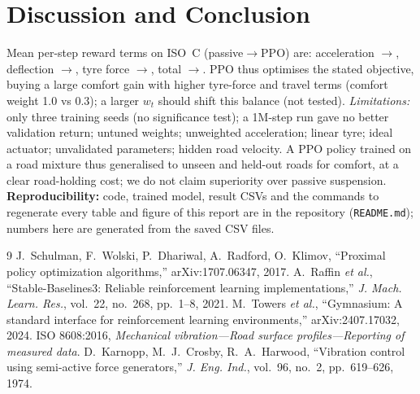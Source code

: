 \documentclass[10pt,twocolumn]{article}
\begin{document}
\section{Discussion and Conclusion}
Mean per-step reward terms on ISO~C (passive$\to$PPO) are: acceleration \NTermAccP$\to$\NTermAccN, deflection \NTermDefP$\to$\NTermDefN, tyre force \NTermTyreP$\to$\NTermTyreN, total \NTermTotP$\to$\NTermTotN. PPO thus optimises the stated objective, buying a large comfort gain with higher tyre-force and travel terms (comfort weight 1.0 vs 0.3); a larger $w_t$ should shift this balance (not tested). \emph{Limitations:} only three training seeds (no significance test); a 1M-step run gave no better validation return; untuned weights; unweighted acceleration; linear tyre; ideal actuator; unvalidated parameters; hidden road velocity. A PPO policy trained on a road mixture thus generalised to unseen and held-out roads for comfort, at a clear road-holding cost; we do not claim superiority over passive suspension. \textbf{Reproducibility:} code, trained model, result CSVs and the commands to regenerate every table and figure of this report are in the repository (\texttt{README.md}); numbers here are generated from the saved CSV files.

\begingroup\footnotesize\setlength{\itemsep}{0pt}
\begin{thebibliography}{9}\setlength{\itemsep}{0pt}\setlength{\parsep}{0pt}
 J.~Schulman, F.~Wolski, P.~Dhariwal, A.~Radford, O.~Klimov, ``Proximal policy optimization algorithms,'' arXiv:1707.06347, 2017.
 A.~Raffin \emph{et al.}, ``Stable-Baselines3: Reliable reinforcement learning implementations,'' \emph{J. Mach. Learn. Res.}, vol.~22, no.~268, pp.~1--8, 2021.
 M.~Towers \emph{et al.}, ``Gymnasium: A standard interface for reinforcement learning environments,'' arXiv:2407.17032, 2024.
 ISO 8608:2016, \emph{Mechanical vibration---Road surface profiles---Reporting of measured data}.
 D.~Karnopp, M.~J.~Crosby, R.~A.~Harwood, ``Vibration control using semi-active force generators,'' \emph{J. Eng. Ind.}, vol.~96, no.~2, pp.~619--626, 1974.
\end{thebibliography}\endgroup
\end{document}
